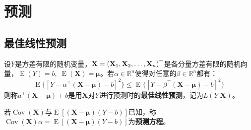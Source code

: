 \section{预测}

\subsection{最佳线性预测}
\begin{definition}
	设$Y$是方差有限的随机变量，$\mathbf{X}=(\mathbf{X}_1, \mathbf{X}_2, \dots, \mathbf{X}_{n})^{\top}$是各分量方差有限的随机向量，$\operatorname{E}(Y)=b,\;\operatorname{E}(\mathbf{X})=\boldsymbol{\mu}$。若$\alpha\in\mathbb{R}^{n}$使得对任意的$\beta\in\mathbb{R}^{n}$都有：
	\begin{equation*}
		\operatorname{E}\{[Y-\alpha^{\top}(\mathbf{X}-\boldsymbol{\mu})-b]^2\}\leqslant\operatorname{E}\{[Y-\beta^{\top}(\mathbf{X}-\boldsymbol{\mu})-b]^2\}
	\end{equation*}
	则称$a^{\top}(\mathbf{X}-\boldsymbol{\mu})+b$是用$\mathbf{X}$对$Y$进行预测时的\textbf{最佳线性预测}，记为$L(Y|\mathbf{X})$。
\end{definition}
\begin{definition}
	若$\operatorname{Cov}(\mathbf{X})$与$\operatorname{E}[(\mathbf{X}-\boldsymbol{\mu})(Y-b)]$已知，称$\operatorname{Cov}(\mathbf{X})\alpha=\operatorname{E}[(\mathbf{X}-\boldsymbol{\mu})(Y-b)]$为\textbf{预测方程}。
\end{definition}
